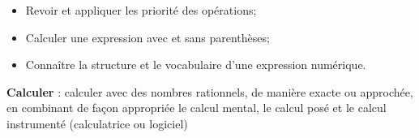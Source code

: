 \begin{myobj}
	\begin{itemize}
		\item Revoir et appliquer les priorité des opérations;
		\item Calculer une expression avec et sans parenthèses;
		\item Connaître la structure et le vocabulaire d'une expression numérique.		
		

	\end{itemize}
\end{myobj}

\begin{mycomp}
	\textbf{Calculer} : calculer avec des nombres rationnels, de manière exacte  ou approchée, en combinant  de  façon  appropriée  le  calcul  mental,  le  calcul  posé  et  le  calcul instrumenté (calculatrice ou logiciel)
	
	
\end{mycomp}